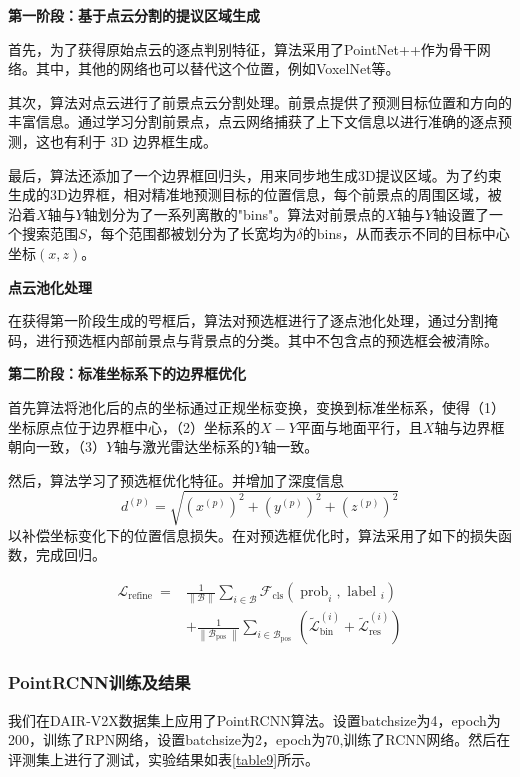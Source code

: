 \textbf{第一阶段：基于点云分割的提议区域生成}

首先，为了获得原始点云的逐点判别特征，算法采用了PointNet++\cite{qi2017pointnet++}作为骨干网络。其中，其他的网络也可以替代这个位置，例如VoxelNet\cite{zhou2018voxelnet}等。

其次，算法对点云进行了前景点云分割处理。前景点提供了预测目标位置和方向的丰富信息。通过学习分割前景点，点云网络捕获了上下文信息以进行准确的逐点预测，这也有利于 3D 边界框生成。

最后，算法还添加了一个边界框回归头，用来同步地生成3D提议区域。为了约束生成的3D边界框，相对精准地预测目标的位置信息，每个前景点的周围区域，被沿着$X$轴与$Y$轴划分为了一系列离散的"bins"。算法对前景点的$X$轴与$Y$轴设置了一个搜索范围$S$，每个范围都被划分为了长宽均为$\delta$的bins，从而表示不同的目标中心坐标$(x,z)$。

\textbf{点云池化处理}

在获得第一阶段生成的㕺框后，算法对预选框进行了逐点池化处理，通过分割掩码，进行预选框内部前景点与背景点的分类。其中不包含点的预选框会被清除。

\textbf{第二阶段：标准坐标系下的边界框优化}

首先算法将池化后的点的坐标通过正规坐标变换，变换到标准坐标系，使得（1）坐标原点位于边界框中心，（2）坐标系的$X-Y$平面与地面平行，且$X$轴与边界框朝向一致，（3）$Y$轴与激光雷达坐标系的$Y$轴一致。

然后，算法学习了预选框优化特征。并增加了深度信息$$d^{(p)}=\sqrt{(x^{(p)})^2+(y^{(p)})^2+(z^{(p)})^2}$$以补偿坐标变化下的位置信息损失。在对预选框优化时，算法采用了如下的损失函数，完成回归。

\begin{equation}
    \begin{aligned}
        \mathcal{L}_{\text {refine }}= & \frac{1}{\|\mathcal{B}\|} \sum_{i \in \mathcal{B}} \mathcal{F}_{\mathrm{cls}}\left(\operatorname{prob}_{i}, \text { label }_{i}\right) \\
        & +\frac{1}{\left\|\mathcal{B}_{\text {pos }}\right\|} \sum_{i \in \mathcal{B}_{\text {pos }}}\left(\tilde{\mathcal{L}}_{\text {bin }}^{(i)}+\tilde{\mathcal{L}}_{\text {res }}^{(i)}\right)
        \end{aligned}
\end{equation}

\subsubsection{PointRCNN训练及结果}

我们在DAIR-V2X数据集上应用了PointRCNN算法。设置batchsize为4，epoch为200，训练了RPN网络，设置batchsize为2，epoch为70,训练了RCNN网络。然后在评测集上进行了测试，实验结果如表\ref{table9}所示。

